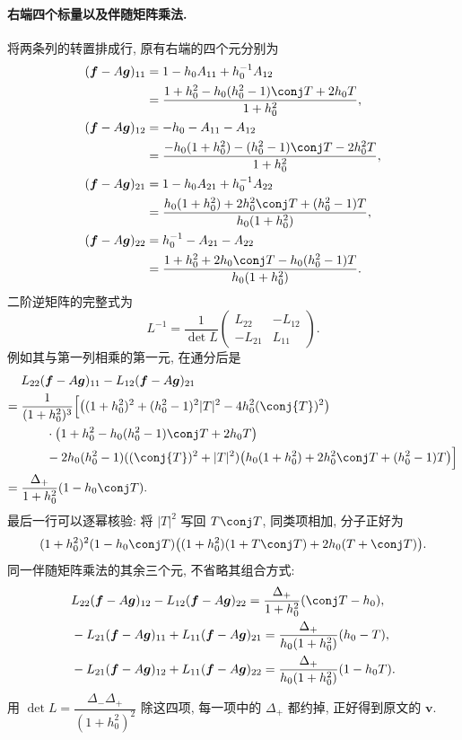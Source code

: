 \paragraph{右端四个标量以及伴随矩阵乘法.}
将两条列的转置排成行, 原有右端的四个元分别为
\[
\begin{aligned}
(\boldsymbol f- A\boldsymbol g)_{11}
&=1-h_0 A_{11}+h_0^{-1} A_{12}\\
&=\dfrac{1+h_0^2-h_0(h_0^2-1)\conj T+2h_0T}
{1+h_0^2},\\
(\boldsymbol f- A\boldsymbol g)_{12}
&=-h_0- A_{11}- A_{12}\\
&=\dfrac{-h_0(1+h_0^2)-(h_0^2-1)\conj T-2h_0^2T}
{1+h_0^2},\\
(\boldsymbol f- A\boldsymbol g)_{21}
&=1-h_0 A_{21}+h_0^{-1} A_{22}\\
&=\dfrac{h_0(1+h_0^2)+2h_0^2\conj T+(h_0^2-1)T}
{h_0(1+h_0^2)},\\
(\boldsymbol f- A\boldsymbol g)_{22}
&=h_0^{-1}- A_{21}- A_{22}\\
&=\dfrac{1+h_0^2+2h_0\conj T-h_0(h_0^2-1)T}
{h_0(1+h_0^2)}.
\end{aligned}
\]
二阶逆矩阵的完整式为
\[
L^{-1}
=\dfrac{1}{\det L}
\begin{pmatrix}L_{22}&-L_{12}\\-L_{21}&L_{11}\end{pmatrix}.
\]
例如其与第一列相乘的第一元, 在通分后是
\[
\begin{aligned}
&L_{22}(\boldsymbol f- A\boldsymbol g)_{11}
-L_{12}(\boldsymbol f- A\boldsymbol g)_{21}\\
={}&\dfrac{1}{(1+h_0^2)^3}
\Bigl[
\bigl((1+h_0^2)^2+(h_0^2-1)^2|T|^2-4h_0^2(\conj{T})^2\bigr)\\
&\qquad\cdot
\bigl(1+h_0^2-h_0(h_0^2-1)\conj T+2h_0T\bigr)\\
&\qquad-2h_0(h_0^2-1)((\conj{T})^2+|T|^2)
\bigl(h_0(1+h_0^2)+2h_0^2\conj T+(h_0^2-1)T\bigr)
\Bigr]\\
={}&\dfrac{\Delta_+}{1+h_0^2}(1-h_0\conj T).
\end{aligned}
\]
最后一行可以逐幂核验: 将 $|T|^2$ 写回 $T\conj T$,
同类项相加, 分子正好为
\[
(1+h_0^2)^2(1-h_0\conj T)
\bigl((1+h_0^2)(1+T\conj T)+2h_0(T+\conj T)\bigr).
\]
同一伴随矩阵乘法的其余三个元, 不省略其组合方式:
\[
\begin{aligned}
&L_{22}(\boldsymbol f- A\boldsymbol g)_{12}
-L_{12}(\boldsymbol f- A\boldsymbol g)_{22}
=\dfrac{\Delta_+}{1+h_0^2}(\conj T-h_0),\\
&-L_{21}(\boldsymbol f- A\boldsymbol g)_{11}
+L_{11}(\boldsymbol f- A\boldsymbol g)_{21}
=\dfrac{\Delta_+}{h_0(1+h_0^2)}(h_0-T),\\
&-L_{21}(\boldsymbol f- A\boldsymbol g)_{12}
+L_{11}(\boldsymbol f- A\boldsymbol g)_{22}
=\dfrac{\Delta_+}{h_0(1+h_0^2)}(1-h_0T).
\end{aligned}
\]
用 $\det L=\dfrac{\Delta_-\Delta_+}{(1+h_0^2)^2}$ 除这四项,
每一项中的 $\Delta_+$ 都约掉, 正好得到原文的 $\boldsymbol v$.

